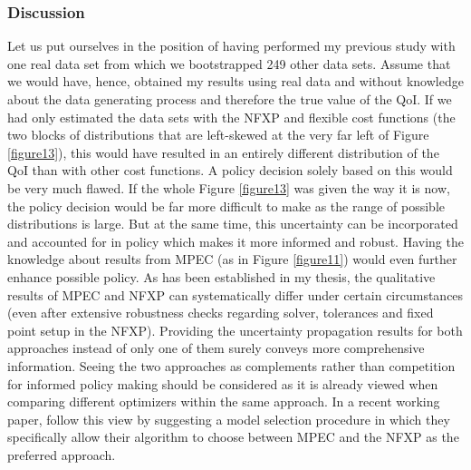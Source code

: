 \subsubsection{Discussion}

Let us put ourselves in the position of having performed my previous study with one real data set from which we bootstrapped 249 other data sets. Assume that we would have, hence, obtained my results using real data and without knowledge about the data generating process and therefore the true value of the QoI. If we had only estimated the data sets with the NFXP and flexible cost functions (the two blocks of distributions that are left-skewed at the very far left of Figure \ref{figure13}), this would have resulted in an entirely different distribution of the QoI than with other cost functions. A policy decision solely based on this would be very much flawed. If the whole Figure \ref{figure13} was given the way it is now, the policy decision would be far more difficult to make as the range of possible distributions is large. But at the same time, this uncertainty can be incorporated and accounted for in policy which makes it more informed and robust. Having the knowledge about results from MPEC (as in Figure \ref{figure11}) would even further enhance possible policy. As has been established in my thesis, the qualitative results of MPEC and NFXP can systematically differ under certain circumstances (even after extensive robustness checks regarding solver, tolerances and fixed point setup in the NFXP). Providing the uncertainty propagation results for both approaches instead of only one of them surely conveys more comprehensive information. Seeing the two approaches as complements rather than competition for informed policy making should be considered as it is already viewed when comparing different optimizers within the same approach. In a recent working paper, \cite{Komiyama.2018} follow this view by suggesting a model selection procedure in which they specifically allow their algorithm to choose between MPEC and the NFXP as the preferred approach.

